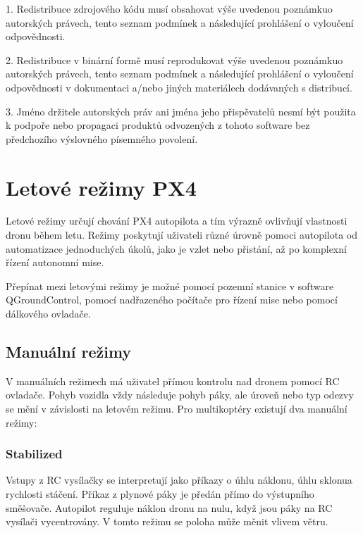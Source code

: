 1. Redistribuce zdrojového kódu musí obsahovat výše uvedenou poznámku\break o autorských právech, tento seznam podmínek a následující prohlášení o vyloučení odpovědnosti.

2. Redistribuce v binární formě musí reprodukovat výše uvedenou poznámku\break o autorských právech, tento seznam podmínek a následující prohlášení o vyloučení odpovědnosti v dokumentaci a/nebo jiných materiálech dodávaných s distribucí.

3. Jméno držitele autorských práv ani jména jeho přispěvatelů nesmí být použita k podpoře nebo propagaci produktů odvozených z tohoto software bez předchozího výslovného písemného povolení.

\section{Letové režimy PX4}
\label{sec:letRez}

Letové režimy určují chování PX4 autopilota a tím výrazně ovlivňují vlastnosti dronu během letu. Režimy poskytují uživateli různé úrovně pomoci autopilota od automatizace jednoduchých úkolů, jako je vzlet nebo přistání, až po komplexní řízení autonomní mise.

Přepínat mezi letovými režimy je možné pomocí pozemní stanice v software QGroundControl, pomocí nadřazeného počítače pro řízení mise nebo pomocí dálkového ovladače. \cite{PX4docs} %

\subsection{Manuální režimy}

V manuálních režimech má uživatel přímou kontrolu nad dronem pomocí RC ovladače. Pohyb vozidla vždy následuje pohyb páky, ale úroveň nebo typ odezvy se mění v závislosti na letovém režimu. Pro multikoptéry existují dva manuální režimy:

\subsubsection{Stabilized}

Vstupy z RC vysílačky se interpretují jako příkazy o úhlu náklonu, úhlu sklonu\break a rychlosti stáčení. Příkaz z plynové páky je předán přímo do výstupního směšovače. Autopilot reguluje náklon dronu na nulu, když jsou páky na RC vysílači vycentrovány. V tomto režimu se poloha může měnit vlivem větru.

